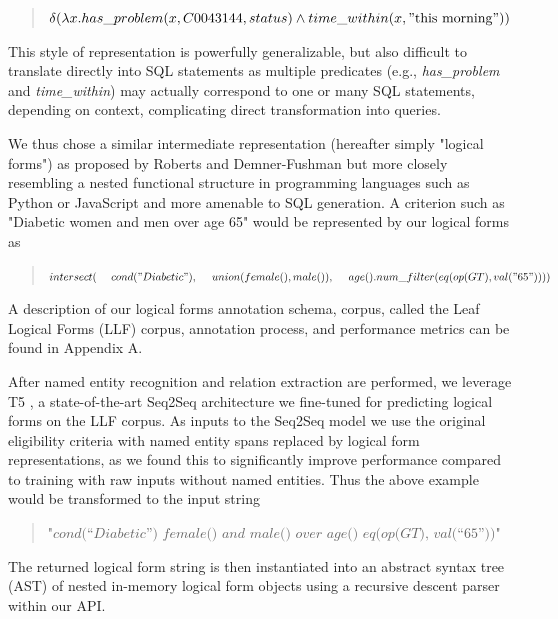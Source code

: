 \documentclass[../main.tex]{subfiles}
\begin{document}
\begin{quote}
    \centering
    $\delta( \lambda x.has\_problem(x, C0043144, status) \wedge time\_within(x, \mathrm{"this\ morning"}))$
\end{quote}

\noindent This style of representation is powerfully generalizable, but also difficult to translate directly into SQL statements as multiple predicates (e.g., \textit{has\_problem} and \textit{time\_within}) may actually correspond to one or many SQL statements, depending on context, complicating direct transformation into queries.

We thus chose a similar intermediate representation (hereafter simply "logical forms") as proposed by Roberts and Demner-Fushman but more closely resembling a nested functional structure in programming languages such as Python or JavaScript and more amenable to SQL generation. A criterion such as "Diabetic women and men over age 65" would be represented by our logical forms as

\begin{quote}
$intersect( \\
    \mathrm{\ \ \ \ }cond("Diabetic"), \\
    \mathrm{\ \ \ \ }union(female(), male()),\\
    \mathrm{\ \ \ \ }age().num\_filter(eq(op(GT), val("65"))) \\
)$
\end{quote}

\noindent A description of our logical forms annotation schema, corpus, called the Leaf Logical Forms (LLF) corpus, annotation process, and performance metrics can be found in Appendix A.

After named entity recognition and relation extraction are performed, we leverage T5 \cite{raffel2020exploring}, a state-of-the-art Seq2Seq architecture we fine-tuned for predicting logical forms on the LLF corpus. As inputs to the Seq2Seq model we use the original eligibility criteria with named entity spans replaced by logical form representations, as we found this to significantly improve performance compared to training with raw inputs without named entities. Thus the above example would be transformed to the input string

\begin{quote}
    \centering
    $\textit{"cond(“Diabetic”) female() and male() over age() eq(op(GT), val(“65”))"}$
\end{quote}

\noindent The returned logical form string is then instantiated into an abstract syntax tree (AST) of nested in-memory logical form objects using a recursive descent parser \cite{johnstone1998generalised} within our API.
\end{document}
